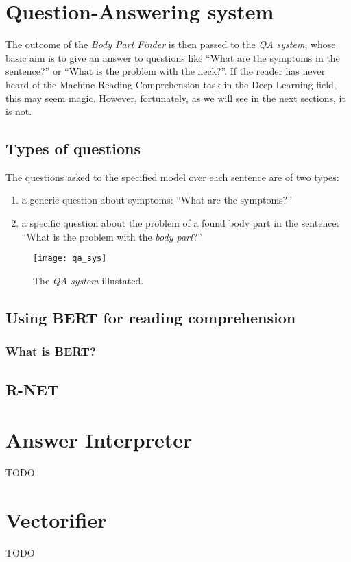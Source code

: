 \section{Question-Answering system}
\label{sec:qa_system}
The outcome of the \textit{Body Part Finder} is then passed to the \textit{QA system}, whose basic aim is to give an answer to questions like “What are the symptoms in the sentence?” or “What is the problem with the neck?”. If the reader has never heard of the Machine Reading Comprehension task in the Deep Learning field, this may seem magic. However, fortunately, as we will see in the next sections, it is not.

\subsection{Types of questions}
The questions asked to the specified model over each sentence are of two types:
\begin{enumerate}
  \item a generic question about symptoms: “What are the symptoms?”
  \item a specific question about the problem of a found body part in the sentence: “What is the problem with the \textit{body part}?”
\end{enumerate}

\begin{figure}[h]
\centering
\texttt{[image: qa\_sys]}
\caption{The \textit{QA system} illustated.}
\medskip
\end{figure}

\subsection{Using BERT for reading comprehension}
\subsubsection{What is BERT?}
\subsection{R-NET}


\section{Answer Interpreter}
\label{sec:answer_interpreter}
TODO


\section{Vectorifier}
\label{sec:body_part_finder}
TODO


